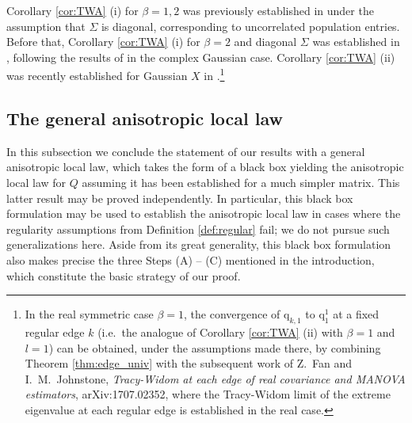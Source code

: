 \documentclass[11pt]{article} %
\numberwithin{equation}{section}
\numberwithin{figure}{section}
\theoremstyle{plain} %
\theoremstyle{definition} %
\newcommand{\f}[1]{\boldsymbol{\mathrm{#1}}} %
\begin{document}
Corollary \ref{cor:TWA} (i) for $\beta = 1,2$ was previously established in \cite{SL} under the assumption that $\Sigma$ is diagonal, corresponding to uncorrelated population entries. Before that, Corollary \ref{cor:TWA} (i) for $\beta = 2$ and diagonal $\Sigma$ was established in \cite{BaoPanZhou}, following the results of \cite{ElK2, Ona} in the complex Gaussian case. Corollary \ref{cor:TWA} (ii) was recently established for Gaussian $X$ in \cite{HHN}.\footnote{In the real symmetric case $\beta = 1$, the convergence of $\f q_{k,1}$ to $\f q_1^1$ at a fixed regular edge $k$ (i.e.\ the analogue of Corollary \ref{cor:TWA} (ii) with $\beta = 1$ and $l = 1$) can be obtained, under the assumptions made there, by combining Theorem \ref{thm:edge_univ} with the subsequent work of Z.\ Fan and I.\ M.\ Johnstone, \emph{Tracy-Widom at each edge of real covariance and MANOVA estimators}, arXiv:1707.02352, where the Tracy-Widom limit of the extreme eigenvalue at each regular edge is established in the real case.}




\subsection{The general anisotropic local law} \label{sec:general_results}

In this subsection we conclude the statement of our results with a general anisotropic local law, which takes the form of a black box yielding the anisotropic local law for $Q$ assuming it has been established for a much simpler matrix. This latter result may be proved independently. In particular, this black box formulation may be used to establish the anisotropic local law in cases where the regularity assumptions from Definition \ref{def:regular} fail; we do not pursue such generalizations here. Aside from its great generality, this black box formulation also makes precise the three Steps (A) -- (C) mentioned in the introduction, which constitute the basic strategy of our proof.
\end{document}
